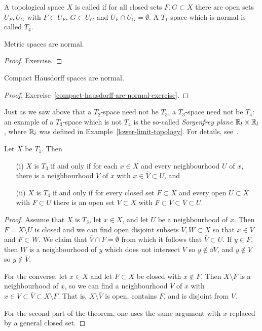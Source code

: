 \begin{defn}
  A topological space $X$ is called  if for all closed sets $F,G \subset X$ there are open sets $U_F, U_G$ with $F \subset U_F$, $G \subset U_G$ and $U_F \cap U_G = \emptyset$. A $T_1$-space which is normal is called $T_4$.
\end{defn}
\begin{prop}
  \label{metric-spaces-normal}
  Metric spaces are normal.
\end{prop}
\begin{proof}
  Exercise.
\end{proof}
\begin{prop}
  \label{compact-hausdorff-normal}
  Compact Hausdorff spaces are normal.
\end{prop}
\begin{proof}
  Exercise~\ref{compact-hausdorff-are-normal-exercise}.
\end{proof}
\begin{example}
  Just as we saw above that a $T_2$-space need not be $T_3$, a $T_3$-space need not be $T_4$: an example of a $T_3$-space which is not $T_4$ is the so-called \emph{Sorgenfrey plane} $\mathbb{R}_l \times \mathbb{R}_l$, where $\mathbb{R}_l$ was defined in Example~\ref{lower-limit-topology}. For details, see~\cite[\S 31, Example 3]{Mun}.
\end{example}

\begin{lem}
  \label{separation-squeeze-lemma}
  Let $X$ be $T_1$. Then
  \begin{itemize}
    \item[(i)] $X$ is $T_3$ if and only if for each $x \in X$ and every neighbourhood $U$ of $x$, there is a neighbourhood $V$ of $x$ with $x \in \bar V \subset U$, and
    \item[(ii)] $X$ is $T_4$ if and only if for every closed set $F \subset X$ and every open $U \subset X$ with $F \subset U$ there is an open set $V \subset X$ with $F \subset V \subset \bar V \subset U$.
  \end{itemize}
\end{lem}
\begin{proof}
  Assume that $X$ is $T_3$, let $x \in X$, and let $U$ be a neighbourhood of $x$. Then $F = X \setminus U$ is closed and we can find open disjoint subsets $V,W \subset X$ so that $x \in V$ and $F \subset W$. We claim that $\bar V \cap F = \emptyset$ from which it follows that $\bar V \subset U$. If $y \in F$, then $W$ is a neighbourhood of $y$ which does not intersect $V$ so $y \notin \dd V$, and $y \notin V$ so $y \notin \bar V$.
  
  For the converse, let $x \in X$ and let $F \subset X$ be closed with $x \notin F$. Then $X \setminus F$ is a neighbourhood of $x$, so we can find a neighbourhood $V$ of $x$ with $x \in V \subset \bar V \subset X \setminus F$. That is, $X \setminus \bar V$ is open, contains $F$, and is disjoint from $V$.
  
  For the second part of the theorem, one uses the same argument with $x$ replaced by a general closed set.
\end{proof}

